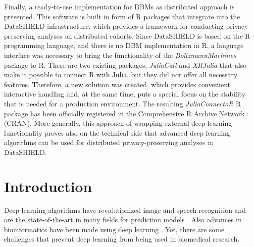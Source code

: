 \documentclass[12pt]{article}
\newcommand{\apkg}[1]{\emph{#1}}
\begin{document}
Finally, a ready-to-use implementation for DBMs as distributed approach is presented.
This software is built in form of R packages that integrate into the DataSHIELD infrastructure, which provides a framework for conducting privacy-preserving analyses on distributed cohorts.
Since DataSHIELD is based on the R programming language, and there is no DBM implementation in R, a language interface was necessary to bring the functionality of the \apkg{BoltzmannMachines} package to R.
There are two existing packages, \apkg{JuliaCall} and \apkg{XRJulia} that also make it possible to connect R with Julia, but they did not offer all necessary features.
Therefore, a new solution was created, which provides convenient interactive handling and, at the same time, puts a special focus on the stability that is needed for a production environment.
The resulting \apkg{JuliaConnectoR} R package has been officially registered in the Comprehensive R Archive Network (CRAN).
More generally, this approach of wrapping external deep learning functionality proves also on the technical side that advanced deep learning algorithms can be used for distributed privacy-preserving analyses in DataSHIELD.


\clearpage
\section{Introduction}

Deep learning algorithms have revolutionized image and speech recognition and are the state-of-the-art in many fields for prediction models \citep{goodfellow_deep_2016}.
Also advances in bioinformatics have been made using deep learning \citep{min_deep_2017}.
Yet, there are some challenges that prevent deep learning from being used in biomedical research. 
\end{document}

